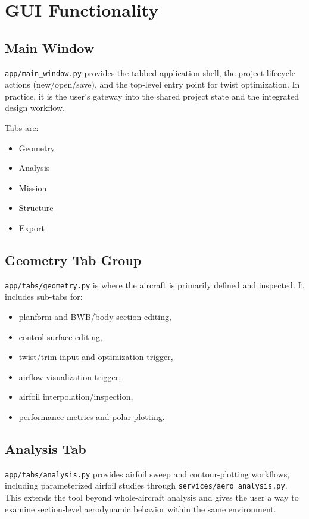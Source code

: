 \section{GUI Functionality}
\subsection{Main Window}
\texttt{app/main\_window.py} provides the tabbed application shell, the project lifecycle actions (new/open/save), and the top-level entry point for twist optimization. In practice, it is the user's gateway into the shared project state and the integrated design workflow.

Tabs are:
\begin{itemize}
\item Geometry
\item Analysis
\item Mission
\item Structure
\item Export
\end{itemize}

\subsection{Geometry Tab Group}
\texttt{app/tabs/geometry.py} is where the aircraft is primarily defined and inspected. It includes sub-tabs for:
\begin{itemize}
\item planform and BWB/body-section editing,
\item control-surface editing,
\item twist/trim input and optimization trigger,
\item airflow visualization trigger,
\item airfoil interpolation/inspection,
\item performance metrics and polar plotting.
\end{itemize}

\subsection{Analysis Tab}
\texttt{app/tabs/analysis.py} provides airfoil sweep and contour-plotting workflows, including parameterized airfoil studies through \texttt{services/aero\_analysis.py}. This extends the tool beyond whole-aircraft analysis and gives the user a way to examine section-level aerodynamic behavior within the same environment.

